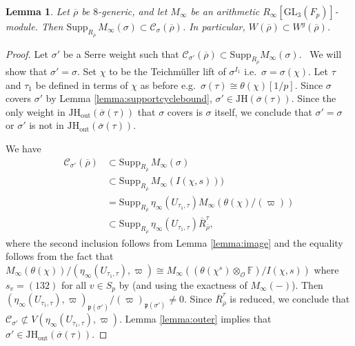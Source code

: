\documentclass[oneside,a4paper,english, 11pt]{amsart}
\theoremstyle{plain}
\theoremstyle{plain}
\theoremstyle{plain}
\newtheorem{lemma}[thm]{Lemma}
\theoremstyle{plain}
\theoremstyle{plain}
\theoremstyle{plain}
\theoremstyle{definition}
\theoremstyle{definition}
\theoremstyle{definition}
\theoremstyle{remark}
\numberwithin{equation}{section}
\newcommand{\F}{\mathbb{F}}
\newcommand{\fp}{\mathfrak{p}}
\newcommand{\cC}{\mathcal{C}}
\newcommand{\cO}{\mathcal{O}}
\newcommand{\GL}{\mathrm{GL}}
\newcommand{\JH}{\mathrm{JH}}
\newcommand{\supp}{\mathrm{Supp}}
\newcommand{\rhobar}{\overline{\rho}}
\newcommand{\ovl}[1]{\overline{#1}}
\begin{document}
\begin{lemma}\label{lemma:supportupperbound}
Let $\rhobar$ be $8$-generic, and let $M_\infty$ be an arithmetic $R_\infty[\GL_3(F_p)]$-module. 
Then $\supp_{R_{\rhobar}} \, M_\infty(\sigma) \subset \cC_\sigma(\rhobar)$. 
In particular, $W(\rhobar) \subset W^g(\rhobar)$. 
\end{lemma}
\begin{proof}
Let $\sigma'$ be a Serre weight such that $\cC_{\sigma'}(\rhobar) \subset \supp_{R_{\rhobar}}M_\infty(\sigma)$. \
We will show that $\sigma' = \sigma$. 
Set $\chi$ to be the Teichm\"uller lift of $\sigma^{I_1}$ i.e.~$\sigma =\sigma(\chi)$. 
Let $\tau$ and $\tau_1$ be defined in terms of $\chi$ as before e.g.~$\sigma(\tau) \cong \theta(\chi)[1/p]$. 
Since $\sigma$ covers $\sigma'$ by Lemma \ref{lemma:supportcyclebound}, $\sigma' \in \JH(\ovl{\sigma}(\tau))$. 
Since the only weight in $\JH_{\mathrm{out}}(\ovl{\sigma}(\tau))$ that $\sigma$ covers is $\sigma$ itself, we conclude that $\sigma' = \sigma$ or $\sigma'$ is not in $\JH_{\mathrm{out}}(\ovl{\sigma}(\tau))$. 

We have
\begin{align*}
\cC_{\sigma'}(\rhobar) &\subset \supp_{R_{\rhobar}}\, M_\infty(\sigma) \\& \subset \supp_{R_{\rhobar}}\, M_\infty(I(\chi,s))) \\&= \supp_{R_{\rhobar}}\,\eta_\infty(U_{\tau_1,\tau}) M_\infty(\theta(\chi)/(\varpi)) \\& \subset \supp_{R_{\rhobar}}\, \eta_\infty(U_{\tau_1,\tau}) \ovl{R}_{\rhobar}^\tau,
\end{align*}
where the second inclusion follows from Lemma \ref{lemma:image} and the equality follows from the fact that $M_\infty(\theta(\chi))/(\eta_\infty(U_{\tau_1,\tau}),\varpi) \cong M_\infty((\theta(\chi^s)\otimes_{\cO} \F)/I(\chi,s))$ where $s_v = (132)$ for all $v\in S_p$ by \cite[(10.1.9)]{LGC} (and using the exactness of $M_\infty(-)$). 
Then $(\eta_\infty(U_{\tau_1,\tau}),\varpi)_{\fp(\sigma')}/(\varpi)_{\fp(\sigma')} \neq 0$. 
Since $\ovl{R}_{\rhobar}^\tau$ is reduced, we conclude that $\cC_{\sigma'} \not\subset V(\eta_\infty(U_{\tau_1,\tau}),\varpi)$. 
Lemma \ref{lemma:outer} implies that $\sigma'\in \JH_{\mathrm{out}}(\ovl{\sigma}(\tau))$. 
\end{proof}
\end{document}
